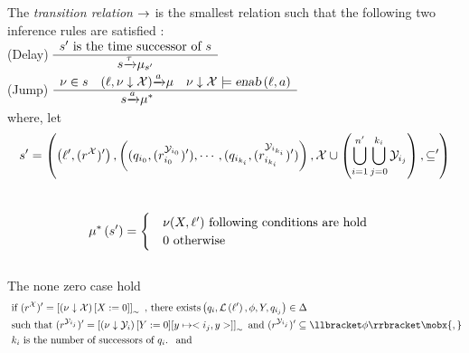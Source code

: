 \begin{definition}

The \emph{transition relation} $\rightarrow$ is the smallest relation such that the following two inference rules are satisfied : \\
(Delay)
$
    \begin{array}{c}
        s' \mbox{ is the time successor of } s \\
        \hline
        {s}{\xrightarrow{\tau}}{\mu_{s'}}
    \end{array}
$
\\
(Jump)
$
    \begin{array}{ccc}
        \nu \in s 
        &
        {\left (
                \ell, \nu \downarrow \mathcal{X}
            \right )}{\xrightarrow{a}}{\mu}
        &
        \nu \downarrow \mathcal{X} \models \mbox{\sl enab}\left( {\ell},{a} \right )
        \\
        \hline
        &
        {s}{\xrightarrow{a}}{\mu^*}
        &
    \end{array}
$
\\
where, let 
\\
$$
s' =  \left (
    \left (
        \ell',(r^{\mathcal{X}})'
    \right )
    ,
    \left (
        (q_{i_0},(r_{i_0}^{\mathcal{Y}_{i_0}})'),
        \cdots,
        (q_{i_{k_i}},(r_{i_{k_i}}^{\mathcal{Y}_{i_{k_i}}})')
    \right )
    ,
    \mathcal{X} \cup \left(
        \bigcup_{i=1}^{n'} \bigcup_{j=0}^{k_i} \mathcal{Y}_{i_j}
    \right )
    ,
    \subseteq'
\right )
$$
\\
\begin{align*}
    &
    \mu^* \left (
       s'
    \right )
    = 
    \begin{cases}
        & 
        \nu(X,\ell')
        \mbox{  following conditions are hold}
        \\
        & 
        0 
        \mbox{  otherwise }
    \end{cases}
\end{align*} 
\\
The none zero case hold
\begin{align*}
    &
    \mbox{ if } (\reg^{\clocksX})' 
                    = 
                    \evclass{ \left (
                            \nu \downarrow \clocksX
                        \right) [X := 0 ]
                    }_\sim 
    \mbox{ , there exists} \left (
        \dtloc_i,
        \lbfunc\left(\loc'\right),
        \phi,
        Y,
        \dtloc_{i_j}
    \right) \in \rules
    \\
    &
    \mbox{ such that }
    (\reg^{\clocksY_{i_j}})' 
        = 
        \evclass{ \left (
                \nu \downarrow \clocksY_{i}
            \right) [Y := 0 ] [y \mapsto <i_j,y>]
        }_\sim 
    \mbox{ and }
    (\reg^{\clocksY_{i_j}})' \subseteq \sat{\phi}
    \mobx{,}
    \\
    &
    \mbox { $ k_i $ is the number of successors of $ \dtloc_i $. } 
    \mbox { and } 
\end{align*} 


\end{definition}
